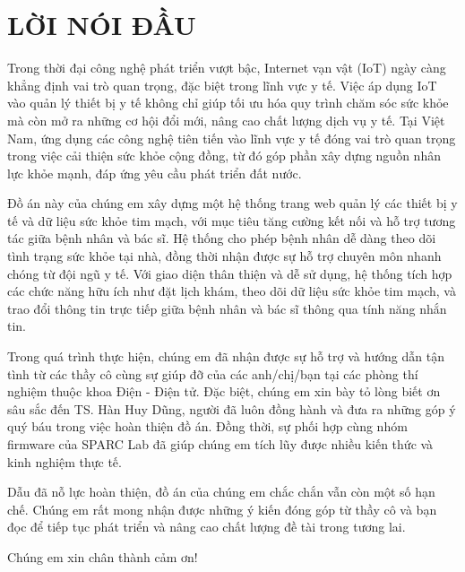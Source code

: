 \section*{LỜI NÓI ĐẦU} %
\thispagestyle{empty}
Trong thời đại công nghệ phát triển vượt bậc, Internet vạn vật (IoT) ngày càng khẳng định vai trò quan trọng, đặc biệt trong lĩnh vực y tế. Việc áp dụng IoT vào quản lý thiết bị y tế không chỉ giúp tối ưu hóa quy trình chăm sóc sức khỏe mà còn mở ra những cơ hội đổi mới, nâng cao chất lượng dịch vụ y tế.
Tại Việt Nam, ứng dụng các công nghệ tiên tiến vào lĩnh vực y tế đóng vai trò quan trọng trong việc cải thiện sức khỏe cộng đồng, từ đó góp phần xây dựng nguồn nhân lực khỏe mạnh, đáp ứng yêu cầu phát triển đất nước.

Đồ án này của chúng em xây dựng một hệ thống trang web quản lý các thiết bị y tế và dữ liệu sức khỏe tim mạch, với mục tiêu tăng cường kết nối và hỗ trợ tương tác giữa bệnh nhân và bác sĩ.
Hệ thống cho phép bệnh nhân dễ dàng theo dõi tình trạng sức khỏe tại nhà, đồng thời nhận được sự hỗ trợ chuyên môn nhanh chóng từ đội ngũ y tế. Với giao diện thân thiện và dễ sử dụng, hệ thống tích hợp các chức năng hữu ích như đặt lịch khám, theo dõi dữ liệu sức khỏe tim mạch, và trao đổi thông tin trực tiếp giữa bệnh nhân và bác sĩ thông qua tính năng nhắn tin.

Trong quá trình thực hiện, chúng em đã nhận được sự hỗ trợ và hướng dẫn tận tình từ các thầy cô cùng sự giúp đỡ của các anh/chị/bạn tại các phòng thí nghiệm thuộc khoa Điện - Điện tử. Đặc biệt, chúng em xin bày tỏ lòng biết ơn sâu sắc đến TS. Hàn Huy Dũng, người đã luôn đồng hành và đưa ra những góp ý quý báu trong việc hoàn thiện đồ án.
Đồng thời, sự phối hợp cùng nhóm firmware của SPARC Lab đã giúp chúng em tích lũy được nhiều kiến thức và kinh nghiệm thực tế.

Dẫu đã nỗ lực hoàn thiện, đồ án của chúng em chắc chắn vẫn còn một số hạn chế. Chúng em rất mong nhận được những ý kiến đóng góp từ thầy cô và bạn đọc để tiếp tục phát triển và nâng cao chất lượng đề tài trong tương lai.

Chúng em xin chân thành cảm ơn!



\cleardoublepage
